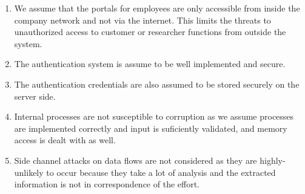\begin{enumerate}
	\item \label{it:ass14} We assume that the portals for employees are only accessible from inside the company network and not via the internet. 
This limits the threats to unauthorized access to customer or researcher functions from outside the system.
	\item \label{it:ass15} The authentication system is assume to be well implemented and secure.
	\item \label{it:ass16} The authentication credentials are also assumed to be stored securely on the server side.
	\item \label{it:ass17} Internal processes are not susceptible to corruption as we assume processes are implemented
correctly and input is suficiently validated, and memory access is dealt with as well.
	\item \label{it:ass18} Side channel attacks on data flows are not considered as they are highly-unlikely to occur
because they take a lot of analysis and the extracted information is not in correspondence of
the effort.

\end{enumerate}
